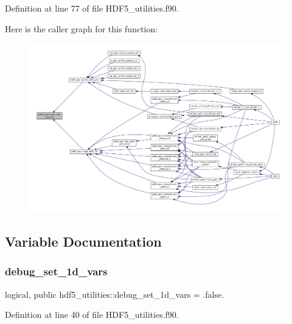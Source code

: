 Definition at line 77 of file H\+D\+F5\+\_\+utilities.\+f90.

Here is the caller graph for this function\+:
\nopagebreak
\begin{figure}[H]
\begin{center}
\leavevmode
\includegraphics[width=350pt]{namespacehdf5__utilities_a7574320980affc30a584f7776d33a51c_icgraph}
\end{center}
\end{figure}


\subsection{Variable Documentation}
\mbox{\label{namespacehdf5__utilities_addf084b90450dc2a0cc614f2f5ac13fc}} 
\subsubsection{\texorpdfstring{debug\+\_\+set\+\_\+1d\+\_\+vars}{debug\_set\_1d\_vars}}
{\footnotesize\ttfamily logical, public hdf5\+\_\+utilities\+::debug\+\_\+set\+\_\+1d\+\_\+vars = .false.}



Definition at line 40 of file H\+D\+F5\+\_\+utilities.\+f90.

